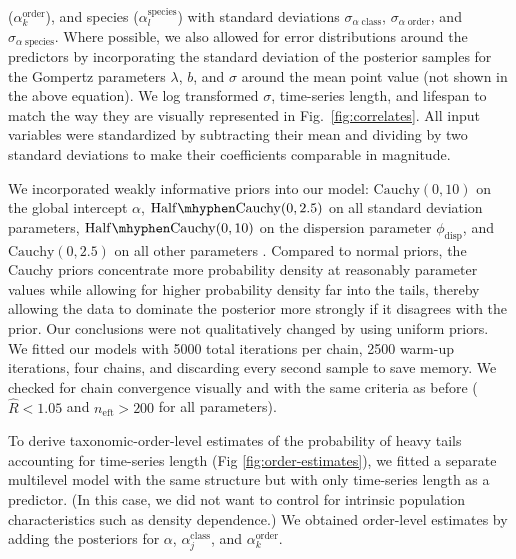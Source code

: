($\alpha^\mathrm{order}_k$), and species ($\alpha^\mathrm{species}_l$) with
standard deviations $\sigma_{\alpha \; \mathrm{class}}$, $\sigma_{\alpha \;
  \mathrm{order}}$, and $\sigma_{\alpha \; \mathrm{species}}$. Where possible,
we also allowed for error distributions around the predictors by incorporating
the standard deviation of the posterior samples for the Gompertz parameters
$\lambda$, $b$, and $\sigma$ around the mean point value (not shown in the above
equation). We log transformed $\sigma$, time-series length, and lifespan to
match the way they are visually represented in Fig.~\ref{fig:correlates}. All
input variables were standardized by subtracting their mean and dividing by two
standard deviations \citep{gelman2008c} to make their coefficients comparable in
magnitude.

We incorporated weakly informative priors into our model: $\mathrm{Cauchy}(0,
10)$ on the global intercept $\alpha$, $\mathrm{Half\mhyphen Cauchy}(0, 2.5)$ on
all standard deviation parameters, $\mathrm{Half\mhyphen Cauchy}(0, 10)$ on the
dispersion parameter $\phi_\mathrm{disp}$, and $\mathrm{Cauchy}(0, 2.5)$ on all
other parameters \citep{gelman2006c, gelman2008d}. Compared to normal priors,
the Cauchy priors concentrate more probability density at reasonably parameter
values while allowing for higher probability density far into the tails, thereby
allowing the data to dominate the posterior more strongly if it disagrees with
the prior. Our conclusions were not qualitatively changed by using uniform
priors. We fitted our models with 5000 total iterations per chain, 2500 warm-up
iterations, four chains, and discarding every second sample to save memory. We
checked for chain convergence visually and with the same criteria as before
($\widehat{R} < 1.05$ and $n_\mathrm{eft} >200$ for all parameters).

To derive taxonomic-order-level estimates of the probability of heavy tails
accounting for time-series length (Fig \ref{fig:order-estimates}), we fitted
a separate multilevel model with the same structure but with only time-series
length as a predictor. (In this case, we did not want to control for intrinsic
population characteristics such as density dependence.) We obtained order-level
estimates by adding the posteriors for $\alpha$, $\alpha^\mathrm{class}_j$, and
$\alpha^\mathrm{order}_k$.





